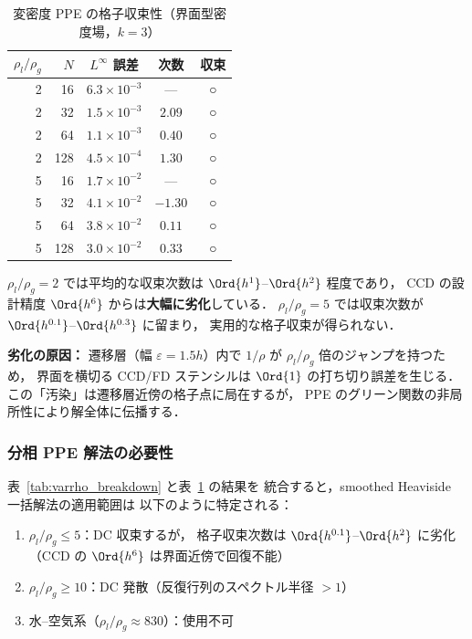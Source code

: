 \begin{table}[htbp]
\centering
\caption{変密度 PPE の格子収束性（界面型密度場，$k = 3$）}
\label{tab:varrho_convergence}
\renewcommand{\arraystretch}{1.3}
\begin{tabular}{rrccc}
\toprule
$\rho_l/\rho_g$ & $N$ & $L^\infty$ 誤差 & 次数 & 収束 \\
\midrule
2 &  16 & $6.3 \times 10^{-3}$ & ---    & ○ \\
2 &  32 & $1.5 \times 10^{-3}$ & $2.09$ & ○ \\
2 &  64 & $1.1 \times 10^{-3}$ & $0.40$ & ○ \\
2 & 128 & $4.5 \times 10^{-4}$ & $1.30$ & ○ \\
\midrule
5 &  16 & $1.7 \times 10^{-2}$ & ---     & ○ \\
5 &  32 & $4.1 \times 10^{-2}$ & $-1.30$ & ○ \\
5 &  64 & $3.8 \times 10^{-2}$ & $0.11$  & ○ \\
5 & 128 & $3.0 \times 10^{-2}$ & $0.33$  & ○ \\
\bottomrule
\end{tabular}
\end{table}

\noindent
$\rho_l/\rho_g = 2$ では平均的な収束次数は $\Ord{h^{1}}$--$\Ord{h^{2}}$ 程度であり，
CCD の設計精度 $\Ord{h^6}$ からは\textbf{大幅に劣化}している．
$\rho_l/\rho_g = 5$ では収束次数が $\Ord{h^{0.1}}$--$\Ord{h^{0.3}}$ に留まり，
実用的な格子収束が得られない．

\noindent\textbf{劣化の原因：}
遷移層（幅 $\varepsilon = 1.5h$）内で $1/\rho$ が
$\rho_l/\rho_g$ 倍のジャンプを持つため，
界面を横切る CCD/FD ステンシルは $\Ord{1}$ の打ち切り誤差を生じる．
この「汚染」は遷移層近傍の格子点に局在するが，
PPE のグリーン関数の非局所性により解全体に伝播する．

\subsubsection{分相 PPE 解法の必要性}
\label{sec:split_ppe_motivation}
\label{sec:gfm_numerical_motivation}%

表~\ref{tab:varrho_breakdown} と表~\ref{tab:varrho_convergence} の結果を
統合すると，smoothed Heaviside 一括解法の適用範囲は
以下のように特定される：

\begin{tcolorbox}[resultbox, title={Smoothed Heaviside 一括解法の適用限界}]
\begin{enumerate}[noitemsep]
  \item $\rho_l/\rho_g \leq 5$：DC 収束するが，
        格子収束次数は $\Ord{h^{0.1}}$--$\Ord{h^{2}}$ に劣化
        （CCD の $\Ord{h^6}$ は界面近傍で回復不能）
  \item $\rho_l/\rho_g \geq 10$：DC 発散（反復行列のスペクトル半径 $> 1$）
  \item 水--空気系（$\rho_l/\rho_g \approx 830$）：使用不可
\end{enumerate}
\end{tcolorbox}


